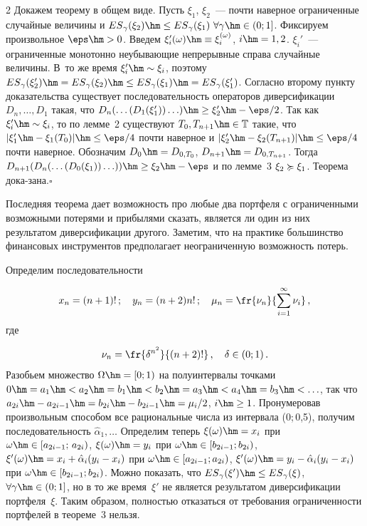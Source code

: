 \begin{multicols}{2}
\noindent
{} Докажем теорему в общем виде. Пусть $\xi_1$, $\xi_2$~---
почти наверное ограниченные случайные величины и
${ES}_\gamma(\xi_2)\hm\le{ES}_\gamma(\xi_1)\ \forall
\gamma\hm\in(0;1]$. Фиксируем произвольное $\eps\hm>0$. Введем
$\xi_i'(\omega) \hm\equiv \xi_i^{(\omega)}$, $i\hm=1,2$. $\xi_i'$~---
ограниченные монотонно неубывающие непрерывные справа случайные
величины. В~то же время $\xi_i'\hm\sim\xi_i$, поэтому
${ES}_\gamma(\xi_2') \hm= {ES}_\gamma(\xi_2) \hm\le {ES}_\gamma(\xi_1) \hm=
{ES}_\gamma(\xi_1')$. Согласно второму пункту доказательства
существует последовательность операторов диверсификации
$D_n,\ldots,D_1$ такая, что
$D_n(\ldots(D_1(\xi_1'))\ldots)\hm\ge\xi_2'\hm-\eps/2$. Так как
$\xi_i'\hm\sim\xi_i$, то по лемме~2 существуют
$T_0,T_{n+1} \hm\in \classT$ такие, что $|\xi_1'\hm-\xi_1(T_0)| \hm\le
\eps/4$ почти наверное и $|\xi_2'\hm-\xi_2(T_{n+1})| \hm\le \eps/4$ почти
наверное. Обозначим $D_0\hm=D_{0,T_0}$, $D_{n+1}\hm=D_{0,T_{n+1}}$. Тогда
$D_{n+1}(D_n(\ldots(D_0(\xi_1))\ldots)) \hm\ge \xi_2 \hm- \eps$ и по лемме~3 
$\xi_2 \succcurlyeq \xi_1$. Теорема дока-\linebreak зана.\hfill$\square$

\smallskip

Последняя теорема дает возможность про любые два портфеля с
ограниченными возможными потерями и прибылями сказать, является ли
один из них результатом диверсификации другого. Заметим, что на
практике большинство финансовых инструментов предполагает
неограниченную возможность потерь.


Определим последовательности

\noindent
$$
x_n=(n+1)!\,;\quad y_n=(n+2)n!\,;\quad
\mu_n=\fr{\nu_n}{\sum\limits_{i=1}^\infty \nu_i}\,,
$$ 
где 

\noindent
$$
\nu_n=\fr{\delta^{n^2}}{(n+2)!}\,,\quad \delta\in (0;1)\,.
$$
Разобьем множество $\Omega\hm=[0;1)$ на полуинтервалы точками
$0\hm=a_1\hm<a_2\hm=b_1\hm<b_2\hm=a_3\hm<a_4\hm=b_3\hm<\ldots$, так что
$a_{2i}\hm-a_{2i-1}\hm=b_{2i}\hm-b_{2i-1}\hm=\mu_i/2$, $i\hm\ge1$. Пронумеровав
произвольным способом все рациональные числа из интервала (0;\,0,5),
получим последовательность $\hat{\alpha}_1,\ldots$ Определим теперь
$\xi(\omega)\hm=x_i$ при $\omega\hm\in[a_{2i-1};\,a_{2i})$,
                                 $\xi(\omega)\hm=y_i$ при $\omega\hm\in[b_{2i-1};b_{2i})$,
                                 $\xi'(\omega)\hm=x_i+\hat{\alpha}_i(y_i-x_i)$ при $\omega\hm\in[a_{2i-1};a_{2i})$,
                                 $\xi'(\omega)\hm=y_i-\hat{\alpha}_i(y_i-x_i)$ при $\omega\hm\in[b_{2i-1};b_{2i})$.
Можно показать, что ${ES}_\gamma(\xi') \hm\le {ES}_\gamma(\xi)$,
$\forall \gamma \hm\in(0;1]$, но в то же время~$\xi'$ не является
результатом диверсификации портфеля~$\xi$. Таким образом,
полностью отказаться от требования ограниченности портфелей в
теореме~3 нельзя.



\end{multicols}
